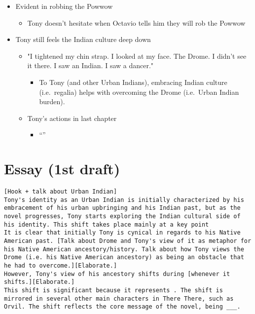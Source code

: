 \documentclass[letterpaper]{article}
\begin{document}
\begin{itemize}
\begin{itemize}
\item Evident in robbing the Powwow

\begin{itemize}
\item Tony doesn't hesitate when Octavio tells him they will rob the
Powwow
\end{itemize}

\item Tony still feels the Indian culture deep down

\begin{itemize}
\item "I tightened my chin strap. I looked at my face. The Drome. I
didn't see it there. I saw an Indian. I saw a dancer."

\begin{itemize}
\item To Tony (and other Urban Indians), embracing Indian culture
(i.e. regalia) helps with overcoming the Drome (i.e. Urban
Indian burden).
\end{itemize}

\item Tony's actions in last chapter

\begin{itemize}
\item “”
\end{itemize}
\end{itemize}
\end{itemize}
\end{itemize}

\section{Essay (1st draft)}
\label{sec:orgea03d0e}
\begin{verbatim}
[Hook + talk about Urban Indian]
Tony's identity as an Urban Indian is initially characterized by his embracement of his urban upbringing and his Indian past, but as the novel progresses, Tony starts exploring the Indian cultural side of his identity. This shift takes place mainly at a key point 
It is clear that initially Tony is cynical in regards to his Native American past. [Talk about Drome and Tony's view of it as metaphor for his Native American ancestory/history. Talk about how Tony views the Drome (i.e. his Native American ancestory) as being an obstacle that he had to overcome.][Elaborate.]
However, Tony's view of his ancestory shifts during [whenever it shifts.][Elaborate.]
This shift is significant because it represents . The shift is mirrored in several other main characters in There There, such as Orvil. The shift reflects the core message of the novel, being ___.
\end{verbatim}
\end{document}
